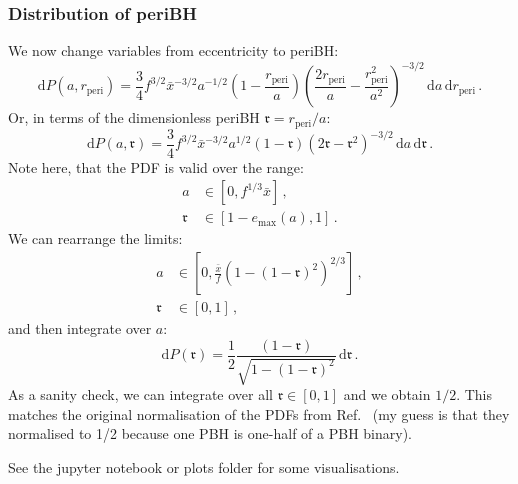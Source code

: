 \documentclass[a4paper,11pt]{article}
\newcommand{\rperi}{r_\mathrm{peri}}
\begin{document}
\subsubsection*{Distribution of periBH}

We now change variables from eccentricity to periBH:
\begin{equation}
\mathrm{d}P(a, \rperi) = \frac{3}{4} f^{3/2} \bar{x}^{-3/2} a^{-1/2} \left(1-\frac{\rperi}{a}\right)\left(\frac{2\rperi}{a} - \frac{\rperi^2}{a^2}\right)^{-3/2}\,\mathrm{d}a\,\mathrm{d}\rperi\,.
\end{equation}
Or, in terms of the dimensionless periBH $\mathfrak{r} = \rperi/a$:
\begin{equation}
\mathrm{d}P(a, \mathfrak{r}) = \frac{3}{4} f^{3/2} \bar{x}^{-3/2} a^{1/2} \left(1-\mathfrak{r}\right)\left(2 \mathfrak{r} - \mathfrak{r}^2\right)^{-3/2}\,\mathrm{d}a\,\mathrm{d}\mathfrak{r}\,.
\end{equation}
Note here, that the PDF is valid over the range:
\begin{align}
a &\in [0, f^{1/3} \bar{x}]\,,\\
\mathfrak{r} &\in [1 - e_\mathrm{max}(a), 1]\,.
\end{align}
We can rearrange the limits:
\begin{align}
a &\in [0, \frac{\bar{x}}{f} \left(1 - (1-\mathfrak{r})^2\right)^{2/3}]\,,\\
\mathfrak{r} &\in [0, 1]\,,
\end{align}
and then integrate over $a$:
\begin{equation}
\mathrm{d}P(\mathfrak{r}) = \frac{1}{2} \frac{\left(1-\mathfrak{r}\right)}{\sqrt{1- (1-\mathfrak{r})^2}}\,\mathrm{d}\mathfrak{r}\,.
\end{equation}
As a sanity check, we can integrate over all $\mathfrak{r} \in [0, 1]$ and we obtain $1/2$. This matches the original normalisation of the PDFs from Ref.~\cite{Sasaki:2016jop} (my guess is that they normalised to 1/2 because one PBH is one-half of a PBH binary).

See the jupyter notebook or plots folder for some visualisations.



\end{document}
